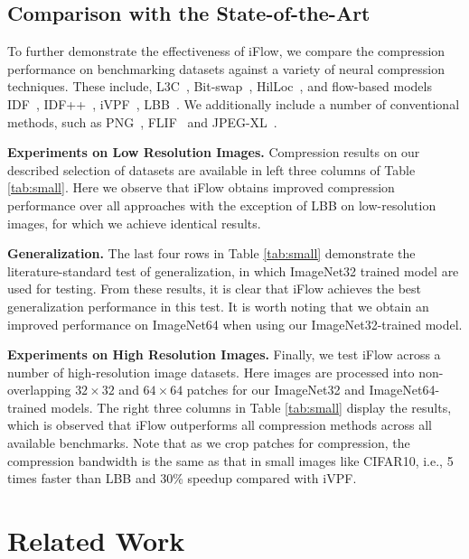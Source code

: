 \documentclass{article}
\begin{document}
\subsection{Comparison with the State-of-the-Art}
To further demonstrate the effectiveness of iFlow, we compare the compression performance on benchmarking datasets against a variety of neural compression techniques. These include, L3C~\cite{mentzer2019practical}, Bit-swap~\cite{kingma2019bit}, HilLoc~\cite{townsend2019hilloc}, and flow-based models IDF~\cite{hoogeboom2019integer}, IDF++~\cite{berg2020idf++}, iVPF~\cite{zhang2021ivpf}, LBB~\cite{ho2019compression}. We additionally include a number of conventional methods, such as PNG~\cite{boutell1997png}, FLIF~\cite{sneyers2016flif} and JPEG-XL~\cite{alakuijala2019jpeg}.

\textbf{Experiments on Low Resolution Images.}
Compression results on our described selection of datasets are available in left three columns of Table \ref{tab:small}. 
Here we observe that iFlow obtains improved compression performance over all approaches with the exception of LBB on low-resolution images, for which we achieve identical results.

\textbf{Generalization.}
The last four rows in Table \ref{tab:small} demonstrate the literature-standard test of generalization, in which ImageNet32 trained model are used for testing. From these results, it is clear that iFlow achieves the best generalization performance in this test. It is worth noting that we obtain an improved performance on ImageNet64 when using our ImageNet32-trained model.

\textbf{Experiments on High Resolution Images.}
Finally, we test iFlow across a number of high-resolution image datasets. Here images are processed into non-overlapping $32 \times 32$ and $64 \times 64$ patches for our ImageNet32 and ImageNet64-trained models. The right three columns in Table \ref{tab:small} display the results, which is observed that iFlow outperforms all compression methods across all available benchmarks. 
Note that as we crop patches for compression, the compression bandwidth is the same as that in small images like CIFAR10, i.e., 5 times faster than LBB and 30\% speedup compared with iVPF.


\vspace{-3pt}
\section{Related Work}
\vspace{-3pt}
\end{document}
